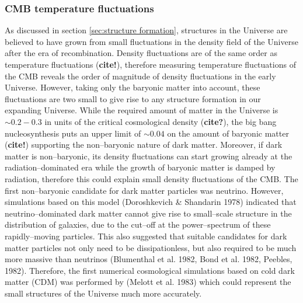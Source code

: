 \documentclass[paper=a4, fontsize=11pt]{scrartcl} %
\numberwithin{equation}{section} %
\numberwithin{figure}{section} %
\numberwithin{table}{section} %
\newcommand{\ignore}[1]{}
\begin{document}
\subsubsection{CMB temperature fluctuations}
As discussed in section \ref{sec:structure formation}, structures in the Universe are believed to have grown from small fluctuations in the density field of the Universe after the era of recombination. Density fluctuations are of the same order as temperature fluctuations ({\bf cite!})\ignore{\bf why? look back in the structure formation part!}, therefore measuring temperature fluctuations of the CMB reveals the order of magnitude of density fluctuations in the early Universe. However, taking only the baryonic matter into account, these fluctuations are two small to give rise to any structure formation in our expanding Universe. While the required amount of matter in the Universe is $\sim 0.2 - 0.3$ in units of the critical cosmological density ({\bf cite?}), the big bang nucleosynthesis puts an upper limit of $\sim 0.04$ on the amount of baryonic matter ({\bf cite!}) supporting the non--baryonic nature of dark matter. Moreover, if dark matter is non--baryonic, its density fluctuations can start growing already at the radiation--dominated era while the growth of baryonic matter is damped by radiation, therefore this could explain small density fluctuations of the CMB.
The first non--baryonic candidate for dark matter particles was neutrino. However, simulations based on this model (Doroshkevich \& Shandarin 1978) indicated that neutrino--dominated dark matter cannot give rise to small--scale structure in the distribution of galaxies, due to the cut--off at the power--spectrum of these rapidly--moving particles. This also suggested that suitable candidates for dark matter particles not only need to be dissipationless, but also required to be much more massive than neutrinos (Blumenthal et al. 1982, Bond et al. 1982, Peebles, 1982). Therefore, the first numerical cosmological simulations based on cold dark matter (CDM) was performed by (Melott et al. 1983) which could represent the small structures of the Universe much more accurately.

\end{document}

